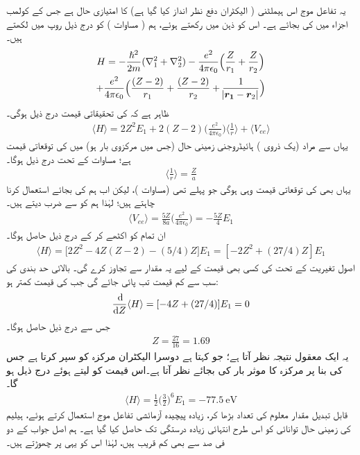  
یہ تفاعل موج اس ہیملٹنی ( الیکٹران دفع نظر انداز کیا گیا ہے) کا امتیازی حال ہے جس کے کولمب اجزاء میں  کی بجائے  ہے۔ اس کو ذہن میں رکھتے ہوئے، ہم  ( مساوات ) کو درج ذیل روپ میں لکھتے ہیں۔
\begin{multline}
H=-\frac{\hslash^{2}}{2m}(\nabla_{1}^{2}+\nabla_{2}^{2})-\frac{e^{2}}{4\pi\epsilon_{0}}\Big(\frac{Z}{r_{1}}+\frac{Z}{r_{2}}\Big)\\
+\frac{e^{2}}{4\pi\epsilon_{0}}\Big(\frac{(Z-2)}{r_{1}}+\frac{(Z-2)}{r_{2}}+\frac{1}{\abs{{{\boldsymbol{r_{1}}}}-{{\boldsymbol{r}}}_{2}}}\Big)
\end{multline}
 ظاہر ہے کہ کی تحقیقاتی قیمت درج ذیل ہوگی۔
\begin{align}
\langle H \rangle = 2Z^{2}E_{1}+2(Z-2)\big(\frac{e^{2}}{4\pi\epsilon_{0}}\big)\big\langle \frac{1}{r}\big\rangle + \langle V_{ee} \rangle 
\end{align}
 یہاں  سے مراد (یک ذروی ) ہائیڈروجنی زمینی حال  (جس میں مرکزوی بار  ہو) میں  کی توقعاتی قیمت ہے؛ مساوات  کے تحت درج ذیل ہوگا۔
\begin{align}
\big\langle \frac{1}{r} \big\rangle = \frac{Z}{a} 
\end{align}
 یہاں بھی  کی توقعاتی قیمت وہی ہوگی جو پہلے تھی (مساوات )، لیکن اب ہم  کی بجائے   استعمال کرنا چاہتے ہیں؛ لہٰذا ہم  کو  سے ضرب دیتے ہیں۔ 
 \begin{align}
\langle V_{ee} \rangle =\frac{5Z}{8a}\big(\frac{e^{2}}{4\pi\epsilon_{0}}\big)=-\frac{5Z}{4}E_{1} 
\end{align}
 ان تمام کو اکٹھے کر کے درج ذیل حاصل ہوگا۔
 \begin{align}
\langle H \rangle =\big[2Z^{2}-4Z(Z-2)-(5/4)Z\big]E_{1}=[-2Z^{2}+(27/4)Z]E_{1} 
\end{align}
 اصول تغیریت کے تحت  کی کسی بھی قیمت کے لیے یہ مقدار  سے تجاوز کرے گی۔ بالائی حد بندی کی سب سے کم قیمت تب پائی جائے گی جب  کی قیمت کمتر ہو:
\begin{align*}
\frac{\dif}{\dif Z}\langle H \rangle =[-4Z+(27/4)]E_{1}=0
\end{align*}
 جس سے درج ذیل حاصل ہوگا۔
\begin{align}
Z=\frac{27}{16}=1.69
\end{align}
 یہ ایک معقول نتیجہ نظر آتا ہے؛ جو کہتا ہے دوسرا الیکٹران مرکزہ کو سپر کرتا ہے جس کی بنا پر مرکزہ کا موثر بار  کی بجائے  نظر آتا ہے۔اس قیمت کو  لیتے ہوئے درج ذیل ہو گا۔
\begin{align}
\langle H \rangle =\frac{1}{2}\big(\frac{3}{2}\big)^{6}E_{1}=\SI{-77.5}{\electronvolt}
\end{align}
 قابل تبدیل مقدار معلوم کی تعداد بڑھا کر، زیادہ پیچیدہ آزمائشی تفاعل موج استعمال کرتے ہوئے، ہیلیم کی زمینی حال توانائی کو اس طرح انتہائی زیادہ درستگی تک حاصل کیا گیا ہے۔ ہم اصل جواب کے دو فی صد سے بھی کم قریب ہیں، لہٰذا اس کو یہی پر چھوڑتے ہیں۔
 
